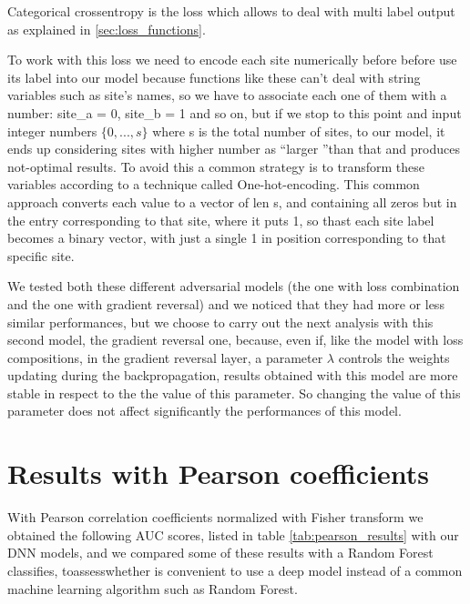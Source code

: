 \documentclass[10pt]{report}
\begin{document}
Categorical crossentropy is the loss which allows to deal with multi label output as explained in \ref{sec:loss_functions}.
\begin{notes}
\item To work with this loss we need to encode each site numerically before before use its label into our model because functions like these can't deal with string variables such as site's names, so we have to associate each one of them with a number: site\_a = 0, site\_b = 1 and so on, but if we stop to this point and input integer numbers $\{0, ..., s\}$ where s is the total number of sites, to our model, it ends up considering sites with higher number as \textquotedblleft larger \textquotedblright than that and produces not-optimal results.
To avoid this a common strategy is to transform these variables according to a technique called One-hot-encoding.
This common approach converts each value to a vector of len s, and containing all zeros but in the entry corresponding to that site, where it puts 1, so thast each site label becomes a binary vector, with just a single 1 in position corresponding to that specific site.
\end{notes}

We tested both these different adversarial models (the one with loss combination and the one with gradient reversal) and we noticed that they had more or less similar performances, but we choose to carry out the next analysis with this second model, the gradient reversal one, because, even if, like the model with loss compositions, in the gradient reversal layer, a parameter $\lambda$ controls the weights updating during the backpropagation,
results obtained with this model are more stable in respect to the the value of this parameter.
So changing the value of this parameter does not affect significantly the performances of this model.

\newpage


\newpage
\section{Results with Pearson coefficients}

With Pearson correlation coefficients normalized with Fisher transform we obtained the following AUC scores, listed in table \ref{tab:pearson_results} with our DNN models, and we compared some of these results with a Random Forest classifies, toassesswhether is convenient to use a deep model instead of a common machine learning algorithm such as Random Forest.
\end{document}
